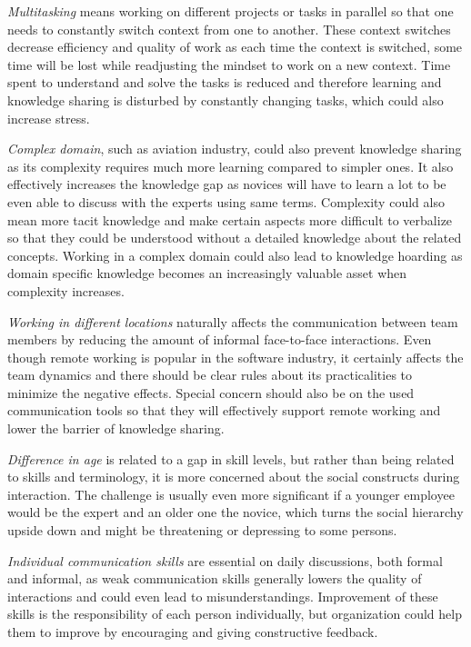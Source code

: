 \emph{Multitasking} means working on different projects or tasks in parallel so that one needs to constantly switch context from one to another. These context switches
decrease efficiency and quality of work as each time the context is switched, some time will be lost while readjusting the mindset to work on a new context. Time spent to
understand and solve the tasks is reduced and therefore learning and knowledge sharing is disturbed by constantly changing tasks, which could also increase stress.
\citep{Ghobadi2016}

\emph{Complex domain}, such as aviation industry, could also prevent knowledge sharing as its complexity requires much more
learning compared to simpler ones. It also effectively increases the knowledge
gap as novices will have to learn a lot to be even able to discuss with the experts using same terms. Complexity could also mean more tacit knowledge and make certain
aspects more difficult to verbalize so that they could be understood without a detailed knowledge about the related concepts. Working in a complex domain could also lead to 
knowledge hoarding as domain specific knowledge becomes an increasingly valuable asset when complexity increases. \citep{Ghobadi2016}

\emph{Working in different locations} naturally affects the communication between team members by reducing the amount of informal face-to-face interactions. Even though remote
working is popular in the software industry, it certainly affects the team dynamics and there should be clear rules about its practicalities to minimize the negative effects.
Special concern should also be on the used communication tools so that they will effectively support remote working and lower the barrier of knowledge sharing. \citep{Ghobadi2016}

\emph{Difference in age} is related to a gap in skill levels, but rather than being related to skills and terminology, it is more concerned about the social constructs during
interaction. The challenge is usually even more significant if a younger employee would be the expert and an older one the novice, which turns the social hierarchy upside down
and might be threatening or depressing to some persons. \citep{Riege2005}

\emph{Individual communication skills} are essential on daily discussions, both formal and informal, as weak communication skills generally lowers the quality of interactions
and could even lead to misunderstandings. Improvement of these skills is the responsibility of each person individually, but organization could help them to improve by
encouraging and giving constructive feedback. \citep{Riege2005}

